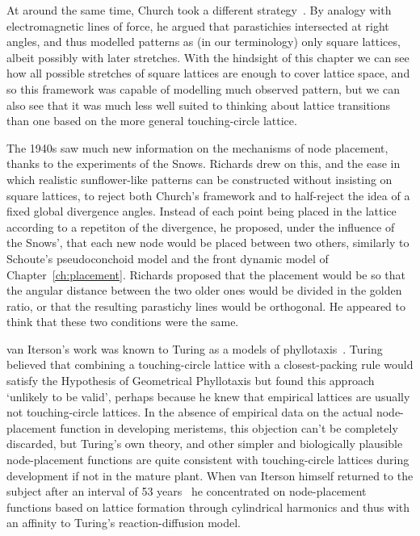 At around the same time, Church took a different strategy~\cite{churchRelationPhyllotaxisMechanical1904}. By analogy with electromagnetic lines of force, he argued that parastichies intersected at right angles,  and thus modelled patterns as (in our terminology) only square lattices, albeit possibly with later stretches. With the hindsight of this chapter we can see how all possible stretches of square lattices are enough to cover lattice space, and so  this framework was capable of modelling much observed pattern, but we can also see that it was much less well suited to thinking about lattice transitions than one based on the more general touching-circle lattice. 

The 1940s saw much new information on the mechanisms of node placement, thanks to the experiments of the Snows. Richards drew on this, and the ease in which realistic sunflower-like patterns can be constructed without insisting on square lattices, to reject both Church's framework and to half-reject the idea of  a fixed global divergence angles. Instead of each point being placed in the lattice according to a repetiton of the divergence, he proposed, under the influence of the Snows', that each new node would be placed between two others, similarly to Schoute's pseudoconchoid model and the front dynamic model of Chapter~\ref{ch:placement}. Richards proposed that the placement would be so that the angular distance between the two older ones would be divided in the golden ratio, or that the resulting parastichy lines would be orthogonal. He appeared to think that these two conditions were the same. 


 van Iterson's work was known to Turing as a models of phyllotaxis~\cite[Section 14]{turingMorphogenTheoryPhyllotaxis2013}. Turing believed that combining a touching-circle lattice with a closest-packing rule would satisfy the Hypothesis of Geometrical Phyllotaxis but found this approach `unlikely to be valid', perhaps because he knew that empirical lattices are usually not  touching-circle lattices.  In the absence of empirical data on the actual node-placement function in developing meristems, this objection can't be completely discarded, but Turing's own theory, and other simpler and biologically plausible node-placement functions are quite consistent with touching-circle lattices during development if not in the mature plant. When van Iterson himself returned to the subject after an interval of 53 years~\autocite{vanitersonjrNewStudiesPhyllotaxis1960} he concentrated on node-placement functions based on lattice formation through cylindrical harmonics and thus with an affinity to Turing's reaction-diffusion model. 

